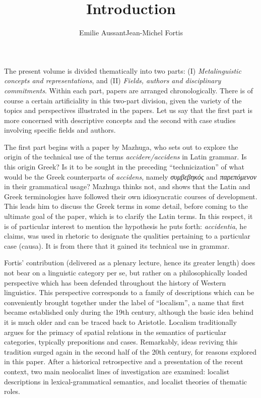 \documentclass[output=paper]{langsci/langscibook}
\title{Introduction}
\author{Emilie Aussant\affiliation{Histoire des Théories Linguistiques (CNRS/Université de Paris)}\lastand Jean-Michel Fortis\affiliation{Histoire des Théories Linguistiques (CNRS/Université de Paris)}}
\begin{document}
\maketitle

The present volume is divided thematically into two parts: (I) \emph{Metalinguistic concepts and representations}, and (II) \emph{Fields, authors and disciplinary commitments}. Within each part, papers are arranged chronologically. There is of course a certain artificiality in this two-part division, given the variety of the topics and perspectives illustrated in the papers. Let us say that the first part is more concerned with descriptive concepts and the second with case studies involving specific fields and authors.

The first part begins with a paper by Mazhuga, who sets out to explore the origin of the technical use of the terms \emph{accidere\slash accidens} in Latin grammar. Is this origin Greek? Is it to be sought in the preceding ``technicization'' of what would be the Greek counterparts of \emph{accidens}, namely \textit{συμβεβηκός} and \textit{παρεπόμενον} in their grammatical usage? Mazhuga thinks not, and shows that the Latin and Greek terminologies have followed their own idiosyncratic courses of development. This leads him to discuss the Greek terms in some detail, before coming to the ultimate goal of the paper, which is to clarify the Latin terms. In this respect, it is of particular interest to mention the hypothesis he puts forth: \emph{accidentia}, he claims, was used in rhetoric to designate the qualities pertaining to a particular case (causa). It is from there that it gained its technical use in grammar.

Fortis' contribution (delivered as a plenary lecture, hence its greater length) does not bear on a linguistic category per se, but rather on a philosophically loaded perspective which has been defended throughout the history of Western linguistics. This perspective corresponds to a family of descriptions which can be conveniently brought together under the label of ``localism'', a name that first became established only during the 19th century, although the basic idea behind it is much older and can be traced back to Aristotle. Localism traditionally argues for the primacy of spatial relations in the semantics of particular categories, typically prepositions and cases. Remarkably, ideas reviving this tradition surged again in the second half of the 20th century, for reasons explored in this paper. After a historical retrospective and a presentation of the recent context, two main neolocalist lines of investigation are examined: localist descriptions in lexical-grammatical semantics, and localist theories of thematic roles.
\end{document}
